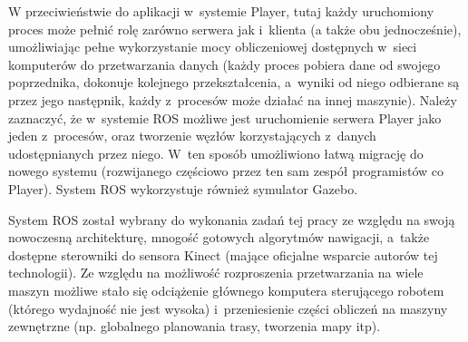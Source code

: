 W przeciwieństwie do aplikacji w~systemie Player, tutaj każdy uruchomiony proces
może pełnić rolę zarówno serwera jak i~klienta (a także obu jednocześnie), umożliwiając
pełne wykorzystanie mocy obliczeniowej dostępnych w~sieci komputerów do przetwarzania
danych (każdy proces pobiera dane od swojego poprzednika, dokonuje kolejnego przekształcenia,
a~wyniki od niego odbierane są przez jego następnik, każdy z~procesów może działać na
innej maszynie). Należy zaznaczyć, że w~systemie ROS możliwe jest uruchomienie serwera Player jako
jeden z~procesów, oraz tworzenie węzłów korzystających z~danych udostępnianych przez
niego. W~ten sposób umożliwiono łatwą migrację do nowego systemu (rozwijanego częściowo
przez ten sam zespół programistów co Player). System ROS wykorzystuje również symulator
Gazebo.

System ROS został wybrany do wykonania zadań tej pracy ze względu na swoją nowoczesną
architekturę, mnogość gotowych algorytmów nawigacji, a~także dostępne sterowniki
do sensora Kinect (mające oficjalne wsparcie autorów tej technologii). Ze względu
na możliwość rozproszenia przetwarzania na wiele maszyn możliwe stało się odciążenie
głównego komputera sterującego robotem (którego wydajność nie jest wysoka) i~przeniesienie
części obliczeń na maszyny zewnętrzne (np. globalnego planowania trasy, tworzenia
mapy itp).
